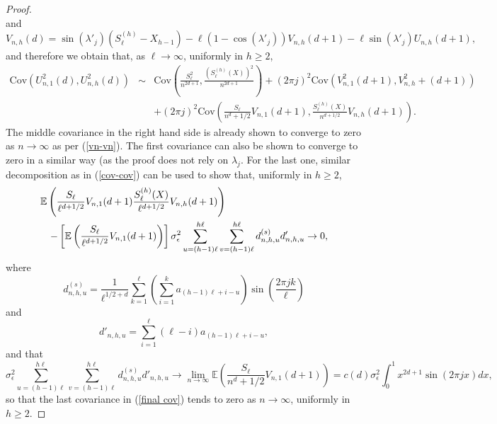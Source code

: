 \documentclass[12pt]{article}
\begin{document}
\begin{proof}
$$$$
and
$$
V_{n,h}(d)=\sin(\lambda'_j)(S_\ell^{(h)}-X_{h-1})-\ell(1-\cos(\lambda'_j))V_{n,h}(d+1)-\ell\sin(\lambda'_j)U_{n,h}(d+1),
$$
and therefore we obtain that, as $\ell\to\infty$, uniformly in $h\ge2$,
\begin{eqnarray}\label{final cov}
\textrm{Cov}\left(U^2_{n,1}(d),U_{n,h}^2(d)\right)
&\sim&\textrm{Cov}\left(\frac{S^2_\ell} {n^{2d+1}},\frac{\left(S_\ell^{(h)}(X)\right)^2}{n^{2d+1}}\right)+
(2\pi j)^2\textrm{Cov}\left(V^2_{n,1}(d+1),V^2_{n,h}+
(d+1)\right)\nonumber\\
&&+(2\pi j)^2\textrm{Cov}\left(\frac{S_\ell}{n^d+1/2}V_{n,1}(d+1),\frac{S_\ell^{(h)}(X)}{n^{d+1/2}}V_{n,h}(d+1)\right).
\end{eqnarray}
The middle covariance in the right hand side is already shown to converge to zero as $n\to\infty$ as per (\ref{vn-vn}). The first covariance can also be shown to converge to zero in a similar way (as the proof does not rely on $\lambda_j$. For the last one, similar decomposition as in (\ref{cov-cov}) can be used to show that, uniformly in $h\ge2$,
\begin{eqnarray*}\lefteqn{
\mathbb{E}\left(\frac{S_\ell}{\ell^{d+1/2}}V_{n,1}(d+1)\frac{S_\ell^{(h)}(X)}{\ell^{d+1/2}}V_{n,h}(d+1)\right)}\\
&&-\left[\mathbb{E}\left(\frac{S_\ell}{\ell^{d+1/2}}V_{n,1}(d+1)\right)\right]\sigma^2_\epsilon\sum_{u=(h-1)\ell}^{h\ell}\sum_{v=(h-1)\ell}^{h\ell}d^{(s)}_{n,h,u}d'_{n,h,u}\to0,\nonumber
\end{eqnarray*}
where
$$
d^{(s)}_{n,h,u}=\frac{1}{\ell^{1/2+d}}\displaystyle\sum_{k=1}^\ell\left(\sum_{i=1}^ka_{(h-1)\ell+i-u}\right)\sin\left(\frac{2\pi jk}{\ell}\right)
$$
and
$$
d'_{n,h,u}=\sum_{i=1}^\ell(\ell-i)a_{(h-1)\ell+i-u},
$$
and that
$$
\sigma^2_\epsilon\sum_{u=(h-1)\ell}^{h\ell}\sum_{v=(h-1)\ell}^{h\ell}d^{(s)}_{n,h,u}d'_{n,h,u}\to\underset{n\to\infty}{\lim}\mathbb{E}\left(\frac{S_\ell}{n^d+1/2}V_{n,1}(d+1)\right)=c(d)\sigma^2_\epsilon\int_0^1x^{2d+1}\sin(2\pi jx)dx,
$$
so that the last covariance in (\ref{final cov}) tends to zero as $n\to\infty$, uniformly in $h\ge2$.
\end{proof}


\end{document}
